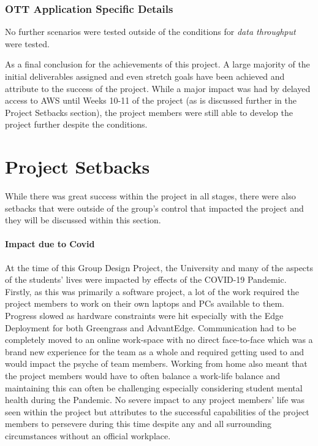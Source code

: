 \subsubsection{OTT Application Specific Details}
No further scenarios were tested outside of the conditions for \textit{data throughput} were tested.

As a final conclusion for the achievements of this project. A large majority of the initial deliverables assigned and even stretch goals have been achieved and attribute to the success of the project. While a major impact was had by delayed access to AWS until Weeks 10-11 of the project (as is discussed further in the Project Setbacks section), the project members were still able to develop the project further despite the conditions. 

\section{Project Setbacks} \label{section:Project Setbacks}
While there was great success within the project in all stages, there were also setbacks that were outside of the group's control that impacted the project and they will be discussed within this section.

\paragraph{Impact due to Covid}
At the time of this Group Design Project, the University and many of the aspects of the students' lives were impacted by effects of the COVID-19 Pandemic. Firstly, as this was primarily a software project, a lot of the work required the project members to work on their own laptops and PCs available to them. Progress slowed as hardware constraints were hit especially with the Edge Deployment for both Greengrass and AdvantEdge. Communication had to be completely moved to an online work-space with no direct face-to-face which was a brand new experience for the team as a whole and required getting used to and would impact the psyche of team members. Working from home also meant that the project members would have to often balance a work-life balance and maintaining this can often be challenging especially considering student mental health during the Pandemic. No severe impact to any project members' life was seen within the project but attributes to the successful capabilities of the project members to persevere during this time despite any and all surrounding circumstances without an official workplace.

